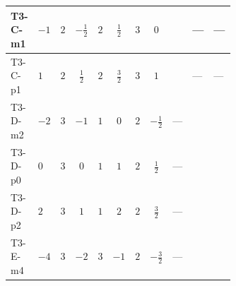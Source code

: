 \documentclass[8pt]{article}
\begin{document}
\begin{landscape}
\begin{longtable}{@{}llcccccc >{\raggedright\arraybackslash}p{0.21\linewidth} >{\raggedright\arraybackslash}p{0.21\linewidth} >{\raggedright\arraybackslash}p{0.21\linewidth}@{}}
\midrule
T3-C-m1 & $-1$ & $2$ & $-\frac{1}{2}$ & $2$ & $\frac{1}{2}$ & $3$ & $0$ & \scriptsize\adjustbox{max width=\linewidth}{$\begin{gathered} {m_1^2} (3 T_{\nu}^{(1)}+6 {\lambda_{S_1}^{(1)}})\end{gathered}$} & --- & --- \\
\midrule
T3-C-p1 & $1$ & $2$ & $\frac{1}{2}$ & $2$ & $\frac{3}{2}$ & $3$ & $1$ & \scriptsize\adjustbox{max width=\linewidth}{$\begin{gathered} {m_1^2} (3 T_{\nu}^{(1)}+6 {\lambda_{S_1}^{(1)}})\end{gathered}$} & --- & --- \\
\midrule
T3-D-m2 & $-2$ & $3$ & $-1$ & $1$ & $0$ & $2$ & $-\frac{1}{2}$ & --- & \scriptsize\adjustbox{max width=\linewidth}{$\begin{gathered} {m_1^2} (2 T_{\nu}^{(1)}+8 {\lambda_{S_1}^{(1)}}+4 {\lambda_{S_1}^{(A)}})\end{gathered}$} & \scriptsize\adjustbox{max width=\linewidth}{$\begin{gathered} -12 {g_2}^2 {m_1^2}\end{gathered}$} \\
\midrule
T3-D-p0 & $0$ & $3$ & $0$ & $1$ & $1$ & $2$ & $\frac{1}{2}$ & --- & \scriptsize\adjustbox{max width=\linewidth}{$\begin{gathered} {m_1^2} (2 T_{\nu}^{(1)}+8 {\lambda_{S_1}^{(1)}}+4 {\lambda_{S_1}^{(A)}})\end{gathered}$} & \scriptsize\adjustbox{max width=\linewidth}{$\begin{gathered} -12 {g_2}^2 {m_1^2}\end{gathered}$} \\
\midrule
T3-D-p2 & $2$ & $3$ & $1$ & $1$ & $2$ & $2$ & $\frac{3}{2}$ & --- & \scriptsize\adjustbox{max width=\linewidth}{$\begin{gathered} {m_1^2} (2 T_{\nu}^{(1)}+8 {\lambda_{S_1}^{(1)}}+4 {\lambda_{S_1}^{(A)}})\end{gathered}$} & \scriptsize\adjustbox{max width=\linewidth}{$\begin{gathered} -12 {g_2}^2 {m_1^2}\end{gathered}$} \\
\midrule
T3-E-m4 & $-4$ & $3$ & $-2$ & $3$ & $-1$ & $2$ & $-\frac{3}{2}$ & --- & \scriptsize\adjustbox{max width=\linewidth}{$\begin{gathered} {m_1^2} (2 T_{\nu}^{(1)}+8 {\lambda_{S_1}^{(1)}}+4 {\lambda_{S_1}^{(A)}})\end{gathered}$} & \scriptsize\adjustbox{max width=\linewidth}{$\begin{gathered} -12 {g_2}^2 {m_1^2}\end{gathered}$} \\

\end{longtable}
\end{landscape}
\end{document}
